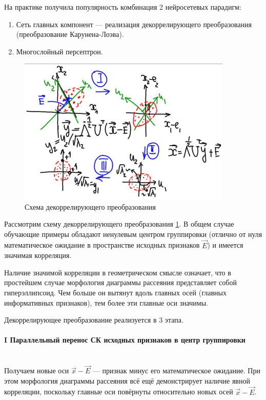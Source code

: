 \documentclass[a4paper]{article}
\numberwithin{equation}{subsection}
\begin{document}
На практике получила популярность комбинация 2 нейросетевых парадигм:
\begin{enumerate}
    \item Сеть главных компонент --- реализация декоррелирующего преобразования
        (преобразование Карунена-Лоэва).
    \item Многослойный персептрон.
\end{enumerate}

\begin{figure}[htbp]
    \centering
    \includegraphics[height=7cm]{hyperflat_11_1.jpeg}
    \caption{Схема декоррелирующего преобразования}
    \label{hyperflat_11_1_prev}
\end{figure}

Рассмотрим схему декоррелирующего преобразования \ref{hyperflat_11_1_prev}.
В общем случае обучающие примеры обладают ненулевым центром группировки (отлично от нуля
математическое ожидание в пространстве исходных признаков $\vec{E}$) и имеется
значимая корреляция.

Наличие значимой корреляции в геометрическом смысле означает, что в простейшем случае
морфология диаграммы рассеяния представляет собой гиперэллипсоид. Чем больше он вытянут 
вдоль главных осей (главных информативных признаков), тем более эти главные оси значимы.

Декоррелирующее преобразование реализуется в 3 этапа.


\paragraph{I Параллельный перенос СК исходных признаков в центр группировки}\mbox{}\\
Получаем новые оси $\vec{x}-\vec{E}$ --- признак минус его математическое ожидание.
При этом морфология диаграммы рассеяния всё ещё демонстрирует наличие явной корреляции,
поскольку главные оси повёрнуты относительно новых осей $\vec{x}-\vec{E}$.
\end{document}
